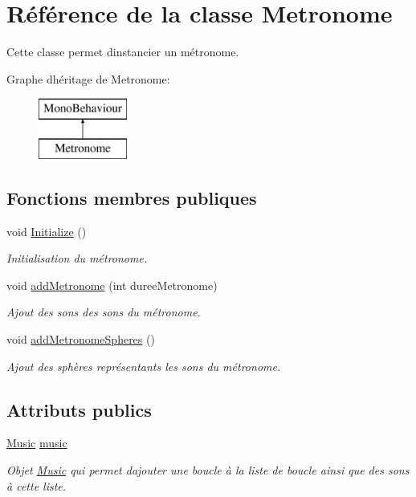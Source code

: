 \hypertarget{class_metronome}{}\section{Référence de la classe Metronome}
\label{class_metronome}


Cette classe permet d\textquotesingle{}instancier un métronome.  


Graphe d\textquotesingle{}héritage de Metronome\+:\begin{figure}[H]
\begin{center}
\leavevmode
\includegraphics[height=2.000000cm]{class_metronome}
\end{center}
\end{figure}
\subsection*{Fonctions membres publiques}
\begin{DoxyCompactItemize}
\item 
void \hyperlink{class_metronome_a0189b04ace6a9f1b5bdb74cb8e3b20bc}{Initialize} ()
\begin{DoxyCompactList}\small\item\em Initialisation du métronome. \end{DoxyCompactList}\item 
void \hyperlink{class_metronome_a1bc290b5b41c27ab776b57214853e05b}{add\+Metronome} (int duree\+Metronome)
\begin{DoxyCompactList}\small\item\em Ajout des sons des sons du métronome. \end{DoxyCompactList}\item 
void \hyperlink{class_metronome_a51f41efee7a5e051c3a4c726f28149eb}{add\+Metronome\+Spheres} ()
\begin{DoxyCompactList}\small\item\em Ajout des sphères représentants les sons du métronome. \end{DoxyCompactList}\end{DoxyCompactItemize}
\subsection*{Attributs publics}
\begin{DoxyCompactItemize}
\item 
\hyperlink{class_music}{Music} \hyperlink{class_metronome_a9434e9e563d5b903c4a800d7529a0c9a}{music}
\begin{DoxyCompactList}\small\item\em Objet \hyperlink{class_music}{Music} qui permet d\textquotesingle{}ajouter une boucle à la liste de boucle ainsi que des sons à cette liste. \end{DoxyCompactList}\end{DoxyCompactItemize}
